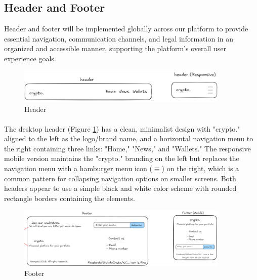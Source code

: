 \subsection{Header and Footer}
 Header and footer will be implemented globally across our platform to  provide essential navigation, communication channels, and legal information in an organized and accessible manner, supporting the platform's overall user experience goals.
\begin{figure}[h]
    \centering
    \includegraphics[width= 0.9\textwidth,  keepaspectratio]{root/header.png}
     \caption{Header}
    \label{fig:header}
\end{figure}
\paragraph{} The desktop header (Figure \ref{fig:header}) has a clean, minimalist design with "crypto." aligned to the left as the logo/brand name, and a horizontal navigation menu to the right containing three links: "Home," "News," and "Wallets." The responsive mobile version maintains the "crypto." branding on the left but replaces the navigation menu with a hamburger menu icon ($\equiv$) on the right, which is a common pattern for collapsing navigation options on smaller screens. Both headers appear to use a simple black and white color scheme with rounded rectangle borders containing the elements.
  \begin{figure}[h]
    \centering
    \includegraphics[width= 0.9\textwidth, keepaspectratio]{root/footer.png}
     \caption{Footer}
    \label{fig:footer}
\end{figure}
